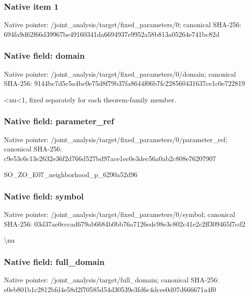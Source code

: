 \documentclass[10pt,a4paper]{article}
\begin{document}
\subsubsection{Native item 1}
Native pointer: /joint\_\allowbreak{}analysis/target/fixed\_\allowbreak{}parameters/0; canonical SHA-256: 694fa9d62f66d39967be49160341da6694937e9952a58b813a05264e741bc82d

\subsubsection{Native field: domain}
Native pointer: /joint\_\allowbreak{}analysis/target/fixed\_\allowbreak{}parameters/0/domain; canonical SHA-256: 9144bc7d5c5a4bc0e75d8f79b37fa8644f06b7fc228560431637ce1c0e722819

\begingroup\raggedright{}<nu<1,\allowbreak{} fixed separately for each theorem-family member.\par\endgroup

\subsubsection{Native field: parameter\_\allowbreak{}ref}
Native pointer: /joint\_\allowbreak{}analysis/target/fixed\_\allowbreak{}parameters/0/parameter\_\allowbreak{}ref; canonical SHA-256: c9e53c6c13e2632e36f2d766d527bd97ace1ec0e3dec56a0ab2c808e76207907

\begingroup\raggedright\sloppy SO\_\allowbreak{}ZO\_\allowbreak{}E07\_\allowbreak{}neighborhood\_\allowbreak{}p\_\allowbreak{}6290a52d96\par\endgroup

\subsubsection{Native field: symbol}
Native pointer: /joint\_\allowbreak{}analysis/target/fixed\_\allowbreak{}parameters/0/symbol; canonical SHA-256: 03d37ae0cccad679ab6684b0bb76a7126edc98e3c802c41e2c2ff309465f7cd2

\begingroup\raggedright\sloppy \textbackslash{}nu\par\endgroup

\subsubsection{Native field: full\_\allowbreak{}domain}
Native pointer: /joint\_\allowbreak{}analysis/target/full\_\allowbreak{}domain; canonical SHA-256: e0eb801b1c2812bfd4e58d2f70585d54d30539e3fd6c4dcee0d07d666671a4f0
\end{document}
